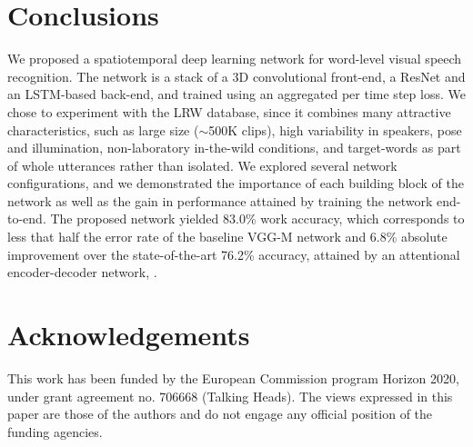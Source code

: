 \documentclass[a4paper]{article}
\begin{document}
\section{Conclusions}
We proposed a spatiotemporal deep learning network for word-level visual speech recognition. The network is a stack of a 3D convolutional front-end, a ResNet and an LSTM-based back-end, and trained using an aggregated per time step loss. We chose to experiment with the LRW database, since it combines many attractive characteristics, such as large size ($\sim$500K clips), high variability in speakers, pose and illumination, non-laboratory in-the-wild conditions, and target-words as part of whole utterances rather than isolated. We explored several network configurations, and we demonstrated the importance of each building block of the network as well as the gain in performance attained by training the network end-to-end. The proposed network yielded 83.0\% work accuracy, which corresponds to less that half the error rate of the baseline VGG-M network and 6.8\% absolute improvement over the state-of-the-art 76.2\% accuracy, attained by an attentional encoder-decoder network, \cite{chung2016lipsent} \cite{chung2016lip}.        
\section{Acknowledgements}
This work has been funded by the European Commission program Horizon 2020, under grant agreement no. 706668 (Talking Heads). The views expressed in this paper are those of the authors and do not engage any official position of the funding agencies.




\end{document}
